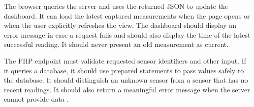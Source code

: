 The browser queries the server and uses the returned JSON to update the
dashboard. It can load the latest captured measurements when the page opens or
when the user explicitly refreshes the view. The dashboard should display an error message
in case a request fails and should also display the time of the latest successful reading. It
should never present an old measurement as current.

The PHP endpoint must validate requested sensor identifiers and other input.
If it queries a database, it should use prepared statements to pass values
safely to the database. It should distinguish an
unknown sensor from a sensor that has no recent readings. It should also
return a meaningful error message when the server cannot provide data \cite{php-pdo-prepared}.

